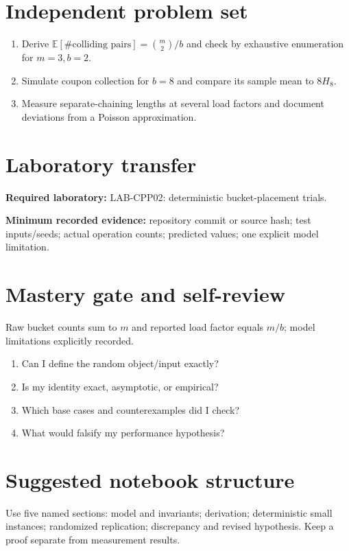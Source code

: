 \documentclass[11pt]{article}
\providecommand{\Expect}{\mathbb{E}}
\begin{document}
\section{Independent problem set}
\begin{enumerate}
\item Derive $\Expect[\#\text{colliding pairs}]=\binom m2/b$ and check by exhaustive enumeration for $m=3,b=2$.
\item Simulate coupon collection for $b=8$ and compare its sample mean to $8H_8$.
\item Measure separate-chaining lengths at several load factors and document deviations from a Poisson approximation.
\end{enumerate}
\section{Laboratory transfer}
\textbf{Required laboratory:} LAB-CPP02: deterministic bucket-placement trials.\par
\noindent\textbf{Minimum recorded evidence:} repository commit or source hash; test inputs/seeds; actual operation counts; predicted values; one explicit model limitation.\par
\section{Mastery gate and self-review}
Raw bucket counts sum to $m$ and reported load factor equals $m/b$; model limitations explicitly recorded.\par
\begin{enumerate}\item Can I define the random object/input exactly? \item Is my identity exact, asymptotic, or empirical? \item Which base cases and counterexamples did I check? \item What would falsify my performance hypothesis?\end{enumerate}
\section{Suggested notebook structure}
Use five named sections: model and invariants; derivation; deterministic small instances; randomized replication; discrepancy and revised hypothesis. Keep a proof separate from measurement results.
\end{document}

